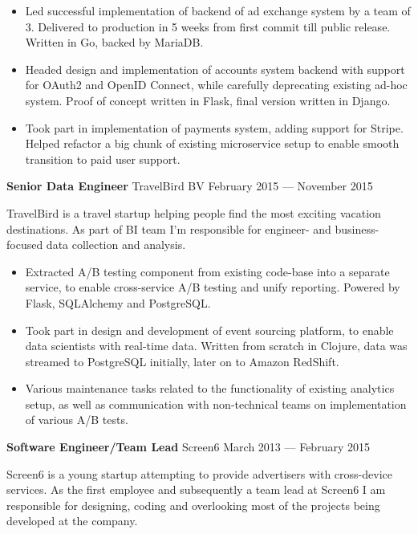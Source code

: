 \documentclass[margin]{res}
\begin{document}
\begin{resume}
\begin{itemize} \itemsep -1pt
\item Led successful implementation of backend of ad exchange system
  by a team of 3. Delivered to production in 5 weeks from first commit
  till public release. Written in Go, backed by MariaDB.
\item Headed design and implementation of accounts system backend with
  support for OAuth2 and OpenID Connect, while carefully deprecating
  existing ad-hoc system. Proof of concept written in Flask, final
  version written in Django.
\item Took part in implementation of payments system, adding support
  for Stripe. Helped refactor a big chunk of existing microservice
  setup to enable smooth transition to paid user support.
\end{itemize}

{\bf Senior Data Engineer} TravelBird BV \hfill February 2015 --- November 2015

TravelBird is a travel startup helping people find the most exciting
vacation destinations. As part of BI team I'm responsible for
engineer- and business-focused data collection and analysis.\\

\begin{itemize} \itemsep -1pt
\item Extracted A/B testing component from existing code-base into a
  separate service, to enable cross-service A/B testing and unify
  reporting. Powered by Flask, SQLAlchemy and PostgreSQL.
\item Took part in design and development of event sourcing platform,
  to enable data scientists with real-time data. Written from scratch
  in Clojure, data was streamed to PostgreSQL initially, later on to
  Amazon RedShift.
\item Various maintenance tasks related to the functionality of
  existing analytics setup, as well as communication with
  non-technical teams on implementation of various A/B tests.
\end{itemize}

{\bf Software Engineer/Team Lead} Screen6 \hfill March 2013 --- February 2015

Screen6 is a young startup attempting to provide advertisers with
cross-device services. As the first employee and subsequently a team
lead at Screen6 I am responsible for designing, coding and overlooking
most of the projects being developed at the company.\\


\end{resume}
\end{document}

